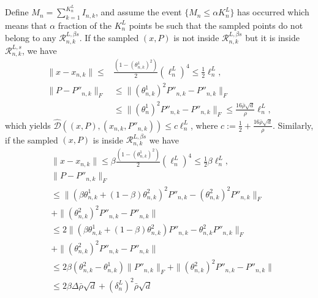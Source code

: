 \documentclass[Afour,sageh,times]{sagej}
\begin{document}
Define $M_n=\sum_{k=1}^{K^L_n} I_{n,k}$, and assume the event $\{M_n\leq \alpha K^L_n\}$ has occurred which means that $\alpha$ fraction of the $K^L_n$ points be such that the sampled points do not belong to any $\mathcal{R}^{L,\beta s}_{n,k}$. 
If the sampled $(x,P)$ is not inside $\mathcal{R}^{L,\beta s}_{n,k}$ but it is inside $\mathcal{R}^{L,s}_{n,k}$, we have
\begin{align*}
     \|x-x_{n,k}\|\leq &  \frac{(1-(\theta^1_{n,k})^2)}{2}(\ell^L_n)^4
     \leq  \frac{1}{2} \ell^L_n,\\
    \|P-P''_{n,k}\|_F &\leq  \|(\theta^1_{n,k})^2 P''_{n,k}-P''_{n,k}\|_F \\
    &\leq \|(\theta^1_n)^2 P''_{n,k}-P''_{n,k}\|_F\leq \frac{16 \bar{\rho} \sqrt{d}}{\rho}  \ell^L_n,
\end{align*}
which yields $\hat{\mathcal{D}}((x,P), (x_{n,k},P''_{n,k})) \leq  c \ell^L_n$, where $c:= \frac{1}{2}+ \frac{16 \bar{\rho} \sqrt{d}}{\rho}$.
Similarly, if the sampled $(x,P)$ is inside $\mathcal{R}^{L,\beta s}_{n,k}$ we have 
\begin{align*}
    & \|x-x_{n,k}\|\leq  \beta\frac{(1-(\theta^1_{n,k})^2)}{2}(\ell^L_n)^4
     \leq  \frac{1}{2} \beta\ell^L_n,\nonumber\\
    &\|P-P''_{n,k}\|_F \nonumber\\
    &\leq  \|(\beta\theta^1_{n,k}+(1-\beta)\theta^2_{n,k})^2 P''_{n,k}-(\theta^2_{n,k})^2P''_{n,k}\|_F\\
    &+\|(\theta^2_{n,k})^2P''_{n,k}-P''_{n,k}\|\\
    &\leq 2\|(\beta\theta^1_{n,k}+(1-\beta)\theta^2_{n,k}) P''_{n,k}-\theta^2_{n,k}P''_{n,k}\|_F\\
    &+\|(\theta^2_{n,k})^2P''_{n,k}-P''_{n,k}\|\\
    & \leq 2\beta(\theta^2_{n,k}- \theta^1_{n,k}) \|P''_{n,k}\|_F +\|(\theta^2_{n,k})^2P''_{n,k}-P''_{n,k}\|\\
    &\leq 2\beta\Delta \bar{\rho} \sqrt{d}+(\delta^L_n)^2\bar{\rho} \sqrt{d}
\end{align*}
\end{document}
